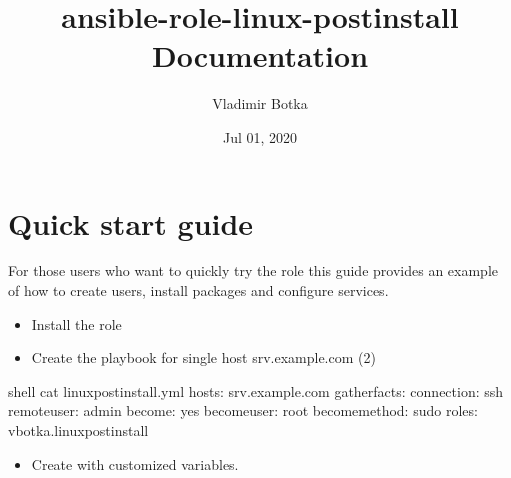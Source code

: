 \documentclass[letterpaper,10pt,english]{sphinxmanual}
\title{ansible-role-linux-postinstall Documentation}
\date{Jul 01, 2020}
\author{Vladimir Botka}
\begin{document}
\pagestyle{empty}
\sphinxmaketitle
\pagestyle{plain}
\sphinxtableofcontents
\pagestyle{normal}
\label{\detokenize{index::doc}}



\chapter{Quick start guide}
\label{\detokenize{qsg:quick-start-guide}}\label{\detokenize{qsg:qg}}\label{\detokenize{qsg::doc}}
For those users who want to quickly try the role this guide provides an example of how to create users, install packages and configure services.
\begin{itemize}
\item {} 
Install the role 

\begin{sphinxVerbatim}[commandchars=\\\{\}]
   
\end{sphinxVerbatim}

\item {} 
Create the playbook  for single host srv.example.com (2)

\end{itemize}

%
\begin{sphinxVerbatim}[commandchars=\\\{\},numbers=left,firstnumber=1,stepnumber=1]
shell\PYGZgt{} cat linux\PYGZhy{}postinstall.yml
\PYGZhy{} hosts: srv.example.com
  gather\PYGZus{}facts: 
  connection: ssh
  remote\PYGZus{}user: admin
  become: yes
  become\PYGZus{}user: root
  become\PYGZus{}method: sudo
  roles:
    \PYGZhy{} vbotka.linux\PYGZus{}postinstall
\end{sphinxVerbatim}
\sphinxresetverbatimhllines
\begin{itemize}
\item {} 
Create  with customized variables.

\end{itemize}
\end{document}
